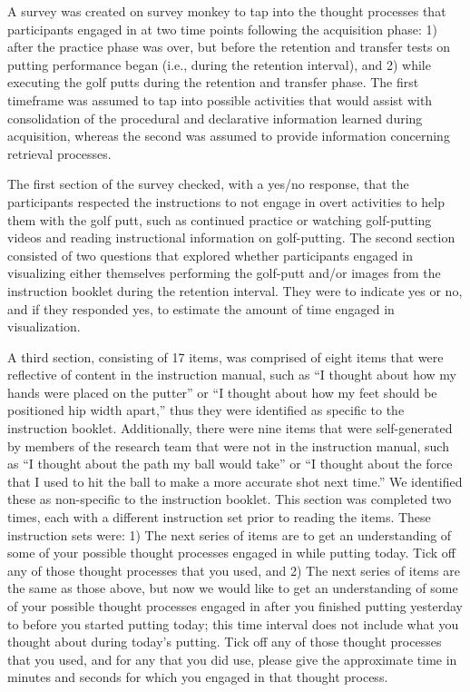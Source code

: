 \documentclass[
  english,
  man,floatsintext]{apa7}
\begin{document}
A survey was created on survey monkey to tap into the thought processes that participants engaged in at two time points following the acquisition phase: 1) after the practice phase was over, but before the retention and transfer tests on putting performance began (i.e., during the retention interval), and 2) while executing the golf putts during the retention and transfer phase. The first timeframe was assumed to tap into possible activities that would assist with consolidation of the procedural and declarative information learned during acquisition, whereas the second was assumed to provide information concerning retrieval processes.

The first section of the survey checked, with a yes/no response, that the participants respected the instructions to not engage in overt activities to help them with the golf putt, such as continued practice or watching golf-putting videos and reading instructional information on golf-putting. The second section consisted of two questions that explored whether participants engaged in visualizing either themselves performing the golf-putt and/or images from the instruction booklet during the retention interval. They were to indicate yes or no, and if they responded yes, to estimate the amount of time engaged in visualization.

A third section, consisting of 17 items, was comprised of eight items that were reflective of content in the instruction manual, such as ``I thought about how my hands were placed on the putter'' or ``I thought about how my feet should be positioned hip width apart,'' thus they were identified as specific to the instruction booklet. Additionally, there were nine items that were self-generated by members of the research team that were not in the instruction manual, such as ``I thought about the path my ball would take'' or ``I thought about the force that I used to hit the ball to make a more accurate shot next time.'' We identified these as non-specific to the instruction booklet. This section was completed two times, each with a different instruction set prior to reading the items. These instruction sets were: 1) The next series of items are to get an understanding of some of your possible thought processes engaged in while putting today. Tick off any of those thought processes that you used, and 2) The next series of items are the same as those above, but now we would like to get an understanding of some of your possible thought processes engaged in after you finished putting yesterday to before you started putting today; this time interval does not include what you thought about during today's putting. Tick off any of those thought processes that you used, and for any that you did use, please give the approximate time in minutes and seconds for which you engaged in that thought process.
\end{document}
